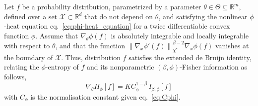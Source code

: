 \documentclass[entropy,article,submit,moreauthors,pdftex]{Definitions/mdpi}
\def\Rset{\mathbb{R}}%
\def\X{\mathcal{X}}%
\begin{document}
\begin{Proposition}
\label{prop:phiDeBruijn}
%
  Let $f$ be a probability distribution, parametrized by a parameter $\theta \in
  \Theta \subseteq \Rset^m$, defined over a set $\X \subset \Rset^d$ that do not
  depend  on  $\theta$,  and   satisfying  the  nonlinear  $\phi$-heat  equation
  eq.~\eqref{eq:phi-heat_equation}  for a  twice differentiable  convex function
  $\phi$.   Assume that  $\nabla_\theta  \phi(f)$ is  absolutely integrable  and
  locally integrable  with respect to  $\theta$, and that the  function $\left\|
  \nabla_x  \phi'(f) \right\|_{\chi^*}^{\beta-2}  \nabla_x \phi(f)$  vanishes at
  the boundary of $\X$.  Thus, distribution $f$ satisfies the extended de Bruijn
  identity,   relating  the   $\phi$-entropy  of   $f$  and   its  nonparametric
  $(\beta,\phi)$-Fisher information as follows,
  \begin{equation}
  \label{eq:phiDeBruijn}
  \nabla_\theta H_\phi[f] = K C_\phi^{1-\beta} \, I_{\beta,\phi}[f]
  \end{equation}
  with $C_\phi$ is the normalisation constant given eq.~\eqref{eq:Cphi}.
\end{Proposition}
\end{document}
